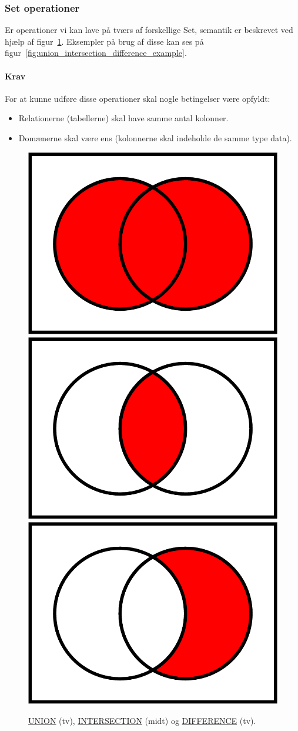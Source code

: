 \subsubsection{Set operationer}

Er operationer vi kan lave på tværs af forskellige Set, semantik er beskrevet ved hjælp af figur~\ref{fig:union_intersection_difference}. Eksempler på brug af disse kan ses på figur~\ref{fig:union_intersection_difference_example}.

\paragraph{Krav}

For at kunne udføre disse operationer skal nogle betingelser være opfyldt: 

\begin{itemize}
	\item Relationerne (tabellerne) skal have samme antal kolonner.
	\item Domænerne skal være ens (kolonnerne skal indeholde de samme type data).
\end{itemize}

\begin{figure}[H]
	\centering
	\includegraphics[width=.3\textwidth]{figs/spm6/union}\hfill
	\includegraphics[width=.3\textwidth]{figs/spm6/intersection}\hfill
	\includegraphics[width=.3\textwidth]{figs/spm6/difference}
	
	\caption{\href{https://en.wikipedia.org/wiki/Union_(set_theory)}{UNION} (tv), \href{https://en.wikipedia.org/wiki/Intersection_(set_theory)}{INTERSECTION} (midt) og \href{https://en.wikipedia.org/wiki/Complement_(set_theory)}{DIFFERENCE} (tv).}
	\label{fig:union_intersection_difference}	
\end{figure}

